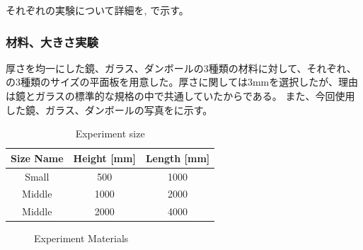 それぞれの実験について詳細を, で示す。

\subsubsection{材料、大きさ実験}
\label{sec:app_exp_material_size_set}
厚さを均一にした鏡、ガラス、ダンボールの3種類の材料に対して、それぞれ、の3種類のサイズの平面板を用意した。厚さに関しては3mmを選択したが、理由は鏡とガラスの標準的な規格の中で共通していたからである。
また、今回使用した鏡、ガラス、ダンボールの写真をに示す。

\begin{table}[tb]
    \centering
    \caption{Experiment size}
    \begin{tabular}{|c|c|c|} \hline
        Size Name & Height [mm] & Length [mm] \\ \hline\hline
        Small  &  500  & 1000 \\ \hline
        Middle &  1000 & 2000 \\ \hline
        Middle &  2000 & 4000 \\ \hline
    \end{tabular}
    \label{tab:app_exp_size_list}
\end{table}

\begin{figure}[tb]
    \centering
    \label{fig:mirror}
    \label{fig:glass}
    \label{fig:cardboard}
    \caption{Experiment Materials}
    \label{fig:app_exp_material}
\end{figure}

